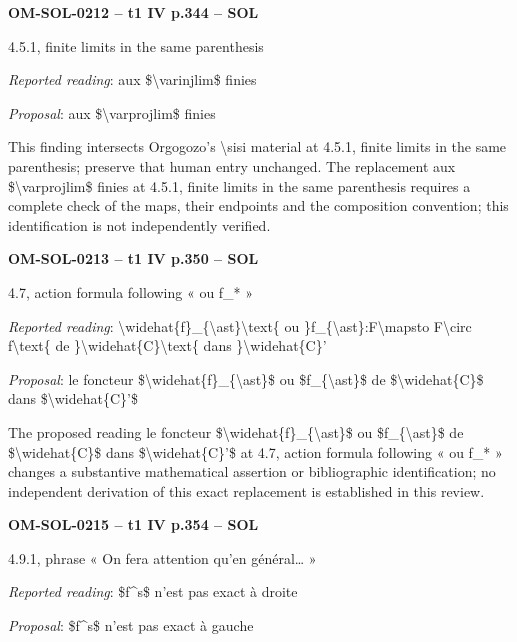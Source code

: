 \par\noindent\textbf{OM-SOL-0212 -- t1 IV p.344 -- SOL}\par
4.5.1, finite limits in the same parenthesis\par
\emph{Reported reading}: aux \$\textbackslash{}varinjlim\$ finies\par
\emph{Proposal}: aux \$\textbackslash{}varprojlim\$ finies\par
This finding intersects Orgogozo's \textbackslash{}sisi material at 4.5.1, finite limits in the same parenthesis; preserve that human entry unchanged. The replacement aux \$\textbackslash{}varprojlim\$ finies at 4.5.1, finite limits in the same parenthesis requires a complete check of the maps, their endpoints and the composition convention; this identification is not independently verified.\par
\par\noindent\textbf{OM-SOL-0213 -- t1 IV p.350 -- SOL}\par
4.7, action formula following « ou f\_* »\par
\emph{Reported reading}: \textbackslash{}widehat\{f\}\_\{\textbackslash{}ast\}\textbackslash{}text\{ ou \}f\_\{\textbackslash{}ast\}:F\textbackslash{}mapsto F\textbackslash{}circ f\textbackslash{}text\{ de \}\textbackslash{}widehat\{C\}\textbackslash{}text\{ dans \}\textbackslash{}widehat\{C\}'\par
\emph{Proposal}: le foncteur \$\textbackslash{}widehat\{f\}\_\{\textbackslash{}ast\}\$ ou \$f\_\{\textbackslash{}ast\}\$ de \$\textbackslash{}widehat\{C\}\$ dans \$\textbackslash{}widehat\{C\}'\$\par
The proposed reading le foncteur \$\textbackslash{}widehat\{f\}\_\{\textbackslash{}ast\}\$ ou \$f\_\{\textbackslash{}ast\}\$ de \$\textbackslash{}widehat\{C\}\$ dans \$\textbackslash{}widehat\{C\}'\$ at 4.7, action formula following « ou f\_* » changes a substantive mathematical assertion or bibliographic identification; no independent derivation of this exact replacement is established in this review.\par
\par\noindent\textbf{OM-SOL-0215 -- t1 IV p.354 -- SOL}\par
4.9.1, phrase « On fera attention qu'en général… »\par
\emph{Reported reading}: \$f\textasciicircum{}s\$ n'est pas exact à droite\par
\emph{Proposal}: \$f\textasciicircum{}s\$ n'est pas exact à gauche\par
